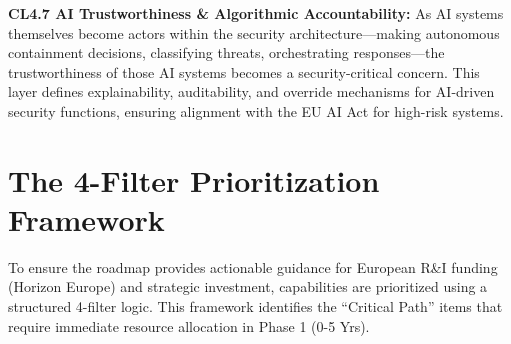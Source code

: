 \documentclass[12pt,a4paper]{report}
\begin{document}
\textbf{CL4.7 AI Trustworthiness \& Algorithmic Accountability:} As AI systems themselves become actors within the security architecture---making autonomous containment decisions, classifying threats, orchestrating responses---the trustworthiness of those AI systems becomes a security-critical concern. This layer defines explainability, auditability, and override mechanisms for AI-driven security functions, ensuring alignment with the EU AI Act for high-risk systems.

\section{The 4-Filter Prioritization Framework}
To ensure the roadmap provides actionable guidance for European R\&I funding (Horizon Europe) and strategic investment, capabilities are prioritized using a structured 4-filter logic. This framework identifies the ``Critical Path''  items that require immediate resource allocation in Phase 1 (0-5 Yrs).
\end{document}
